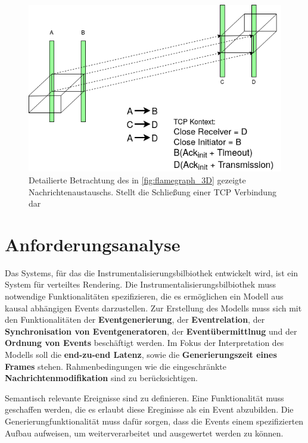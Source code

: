 \begin{figure}[!ht]
	\centering
	\includegraphics[scale=0.5]{img/Problembeschreibung/flamegraph_3D_closing.png}
	\caption[Flammengraph TCP schließung]{Detailierte Betrachtung des in \cref{fig:flamegraph_3D} gezeigte Nachrichtenaustauschs. Stellt die Schließung einer TCP Verbindung dar}
	\label{fig:flamegraph_3D_closing}
\end{figure}


\section{Anforderungsanalyse}
\label{section:Anforderungsanalyse}

Das Systems, für das die Instrumentalisierungsbilbiothek entwickelt wird, ist ein System für verteiltes Rendering. Die Instrumentalisierungsbilbiothek muss notwendige Funktionalitäten spezifizieren, die es ermöglichen ein Modell aus kausal abhängigen Events darzustellen. Zur Erstellung des Modells muss sich mit den Funktionalitäten der \textbf{Eventgenerierung}, der \textbf{Eventrelation}, der \textbf{Synchronisation von Eventgeneratoren}, der \textbf{Eventübermittlnug} und der \textbf{Ordnung von Events} beschäftigt werden. Im Fokus der Interpretation des Modells soll die \textbf{end-zu-end Latenz}, sowie die \textbf{Generierungszeit eines Frames} stehen. Rahmenbedingungen wie die eingeschränkte \textbf{Nachrichtenmodifikation} sind zu berücksichtigen.



Semantisch relevante Ereignisse sind zu definieren. Eine Funktionalität muss geschaffen werden, die es erlaubt diese Ereginisse als ein Event abzubilden. Die Generierungfunktionalität muss dafür sorgen, dass die Events einem spezifizierten Aufbau aufweisen, um weiterverarbeitet und ausgewertet werden zu können.
 


